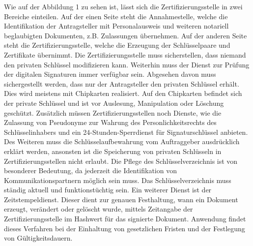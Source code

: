 \newline
\pagebreak
\textbf{} %
\newline
Wie auf der Abbildung 1 zu sehen ist, lässt sich die Zertifizierungsstelle in zwei Bereiche einteilen. Auf der einen Seite steht die Annahmestelle, welche die Identifikation der Antragsteller mit Personalausweis und weiteren notariell beglaubigten Dokumenten, z.B. Zulassungen übernehmen. Auf der anderen Seite steht die Zertifizierungsstelle, welche die Erzeugung der Schlüsselpaare und Zertifikate übernimmt. Die Zertifizierungsstelle muss sicherstellen, dass niemand den privaten Schlüssel modifizieren kann. Weiterhin muss der Dienst zur Prüfung der digitalen Signaturen immer verfügbar sein. Abgesehen davon muss sichergestellt werden, dass nur der Antragsteller den privaten Schlüssel erhält. Dies wird meistens mit Chipkarten realisiert. Auf den Chipkarten befindet sich der private Schlüssel und ist vor Auslesung, Manipulation oder Löschung geschützt. Zusätzlich müssen Zertifizierungsstellen noch Dienste, wie die Zulassung von Pseudonyme zur Wahrung des Personlichkeitsrechts des Schlüsselinhabers und ein 24-Stunden-Sperrdienst für Signaturschlüssel anbieten. Des Weiteren muss die Schlüsselaufbewahrung vom Auftraggeber ausdrücklich erklärt werden, ansonsten ist die Speicherung von privaten Schlüsseln in Zertifizierungsstellen nicht erlaubt. Die Pflege des Schlüsselverzeichnis ist von besonderer Bedeutung, da jederzeit die Identifikation von Kommunikationspartnern möglich sein muss. Das Schlüsselverzeichnis muss ständig aktuell und funktionstüchtig sein. Ein weiterer Dienst ist der Zeitstempeldienst. Dieser dient zur genauen Festhaltung, wann ein Dokument erzeugt, verändert oder gelöscht wurde, mittels Zeitangabe der Zertifizierungsstelle im Hashwert für das signierte Dokument. Anwendung findet dieses Verfahren bei der Einhaltung von gesetzlichen Fristen und der Festlegung von Gültigkeitsdauern. \cite{standdeswissens3}\cite{zertstelle1}